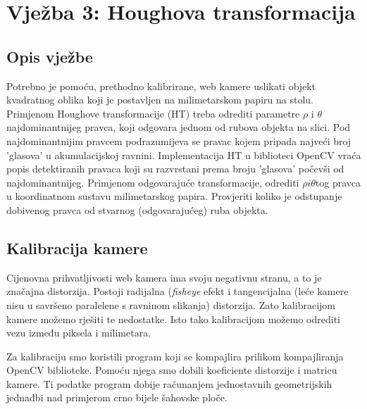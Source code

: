 \section{Vježba 3: Houghova transformacija}

\subsection{Opis vježbe}
Potrebno je pomoću, prethodno kalibrirane, web kamere uslikati objekt
kvadratnog oblika koji je postavljen na milimetarskom papiru na stolu.
Primjenom Houghove transformacije (HT) treba odrediti parametre \(\rho
\) i \( \theta \)najdominantnijeg pravca, koji odgovara jednom od rubova objekta
na slici. Pod najdominantnijim pravcem podrazumijeva se pravac kojem
pripada najveći broj 'glasova' u akumulacijskoj ravnini. Implementacija
HT u biblioteci OpenCV vraća popis detektiranih pravaca koji su
razvrstani prema broju 'glasova' počevši od najdominantnijeg. Primjenom
odgovarajuće transformacije, odrediti \(\rho i \theta \)tog pravca u
koordinatnom sustavu milimetarskog papira. Provjeriti koliko je
odstupanje dobivenog pravca od stvarnog (odgovarajućeg) ruba objekta.

\subsection{Kalibracija kamere}
Cijenovna prihvatljivosti web kamera ima
svoju negativnu stranu, a to je značajna distorzija. 
Postoji radijalna (\textit{fisheye} efekt i tangencijalna (leće kamere
nisu u savršeno paralelene s ravninom slikanja) distorzija. Zato
kalibracijom kamere možemo rješiti te nedostatke. Isto tako kalibracijom
možemo odrediti vezu između piksela i milimetara.

Za kalibraciju smo koristili program koji se kompajlira prilikom
kompajliranja OpenCV biblioteke. Pomoću njega smo dobili koeficiente
distorzije i matricu kamere. Ti podatke program dobije računanjem
jednostavnih geometrijskih jednađbi nad primjerom crno bijele šahovske ploče.

